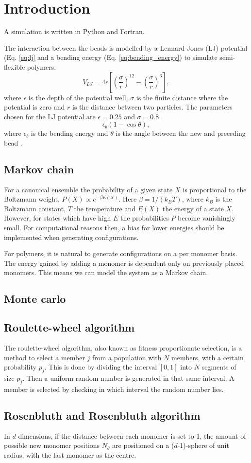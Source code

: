 \section{Introduction}
A simulation is written in Python and Fortran. 

The interaction between the beads is modelled by a Lennard-Jones (LJ) potential (Eq. \ref{eq:lj} and a bending energy (Eq. \ref{eq:bending_energy}) to simulate semi-flexible polymers.
\begin{equation}\label{eq:lj}
    V_{LJ} = 4\epsilon \left[ \left(\frac{\sigma}{r}\right)^{12} - \left(\frac{\sigma}{r}\right)^{6} \right],
\end{equation} where $\epsilon$ is the depth of the potential well, $\sigma$ is the finite distance where the potential is zero and $r$ is the distance between two particles. The parameters chosen for the LJ potential are $\epsilon=0.25$ and $\sigma=0.8$ \cite{jmt}.
\begin{equation}\label{eq:bending_energy}
    \epsilon_b(1-\cos{\theta}),
\end{equation} where $\epsilon_b$ is the bending energy and $\theta$ is the angle between the new and preceding bead \cite{hsu2011review}.

\subsection{Markov chain}
For a canonical ensemble the probability of a given state $X$ is proportional to the Boltzmann weight, $P(X) \propto e^{-\beta E(X)}$. Here $\beta=1/\left(k_B T\right)$, where $k_B$ is the Boltzmann constant, $T$ the temperature and $E(X)$ the energy of a state $X$. However, for states which have high $E$ the probabilities $P$ become vanishingly small. For computational reasons then, a bias for lower energies should be implemented when generating configurations.

For polymers, it is natural to generate configurations on a per monomer basis. The energy gained by adding a monomer is dependent only on previously placed monomers. This means we can model the system as a Markov chain.

\subsection{Monte carlo}

\subsection{Roulette-wheel algorithm}
The roulette-wheel algorithm, also known as fitness proportionate selection, is a method to select a member $j$ from a population with $N$ members, with a certain probability $p_j$. This is done by dividing the interval $[0,1]$ into $N$ segments of size $p_j$. Then a uniform random number is generated in that same interval. A member is selected by checking in which interval the random number lies.


\subsection{Rosenbluth and Rosenbluth algorithm}
In $d$ dimensions, if the distance between each monomer is set to 1, the amount of possible new monomer positions $N_{\theta}$ are positioned on a ($d$-1)-sphere of unit radius, with the last monomer as the centre.